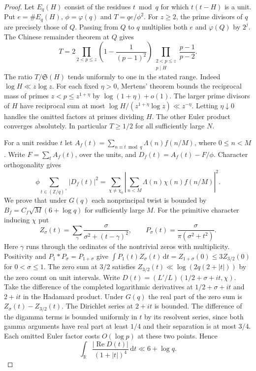 \documentclass[11pt,a4paper]{article}
\newcommand{\SSg}{\mathfrak S}
\newcommand{\dd}{\,\mathrm d}
\DeclareMathOperator{\Rea}{Re}
\begin{document}
\begin{proof}
Let $E_q(H)$ consist of the residues $t\bmod q$ for which
$t(t-H)$ is a unit. Put $e=\#E_q(H)$, $\phi=\varphi(q)$ and
$T=qe/\phi^2$. For $z\ge2$, the prime divisors of $q$ are precisely
those of $Q$. Passing from $Q$ to $q$ multiplies both $e$ and
$\varphi(Q)$ by $2^j$. The Chinese remainder theorem at $Q$ gives
\[
 T=2\prod_{2<p\le z}\left(1-\frac1{(p-1)^2}\right)
       \prod_{\substack{2<p\le z\\p\mid H}}\frac{p-1}{p-2}.
\]
The ratio $T/\SSg(H)$ tends uniformly to one in the stated range.
Indeed $\log H\ll z\log z$. For each fixed $\eta>0$, Mertens' theorem
bounds the reciprocal mass of primes $z<p\le z^{1+\eta}$ by
$\log(1+\eta)+o(1)$. The larger prime divisors of $H$ have reciprocal
sum at most $\log H/(z^{1+\eta}\log z)\ll z^{-\eta}$. Letting
$\eta\downarrow0$ handles the omitted factors at primes dividing $H$.
The other Euler product converges absolutely. In particular $T\ge1/2$
for all sufficiently large $N$.

For a unit residue $t$ let $A_f(t)=\sum_{n\equiv t\bmod q}
\Lambda(n)f(n/M)$, where $0\le n<M$. Write $F=\sum_t A_f(t)$,
over the units, and $D_f(t)=A_f(t)-F/\phi$. Character orthogonality gives
\[
  \phi\sum_{t\in(\mathbb Z/q)^\times}|D_f(t)|^2
    =\sum_{\chi\ne\chi_0}
       \left|\sum_{n<M}\Lambda(n)\chi(n)f(n/M)\right|^2 .
\]
We prove that under $G(q)$ each nonprincipal twist is bounded by
$B_f=C_f\sqrt M(6+\log q)$ for sufficiently large $M$.
For the primitive character inducing $\chi$ put
\[
 Z_\sigma(t)=\sum_\gamma\frac{\sigma}{\sigma^2+(t-\gamma)^2},
 \qquad P_\sigma(t)=\frac{\sigma}{\pi(\sigma^2+t^2)}.
\]
Here $\gamma$ runs through the ordinates of the nontrivial zeros with
multiplicity. Positivity and $P_1*P_\sigma=P_{1+\sigma}$ give
$\int P_1(t)Z_\sigma(t)\dd t=Z_{1+\sigma}(0)\le3Z_{3/2}(0)$
for $0<\sigma\le1$. The zero sum at $3/2$ satisfies
$Z_{3/2}(t)\ll\log(2q(2+|t|))$ by the zero count on unit intervals.
Write $D(t)=(L'/L)(1/2+\sigma+it,\chi)$. Take the difference of the
completed logarithmic derivatives at $1/2+\sigma+it$ and $2+it$ in
the Hadamard product. Under $G(q)$ the real part of the zero sum is
$Z_\sigma(t)-Z_{3/2}(t)$. The Dirichlet series at $2+it$ is bounded.
The difference of the digamma terms is bounded uniformly in $t$ by
its resolvent series, since both gamma arguments have real part at
least $1/4$ and their separation is at most $3/4$. Each omitted
Euler factor costs $O(\log p)$ at these two points. Hence
\[
 \int_{\mathbb R}\frac{|\Rea D(t)|}{(1+|t|)^4}\dd t\ll 6+\log q.
\]


\end{proof}
\end{document}
